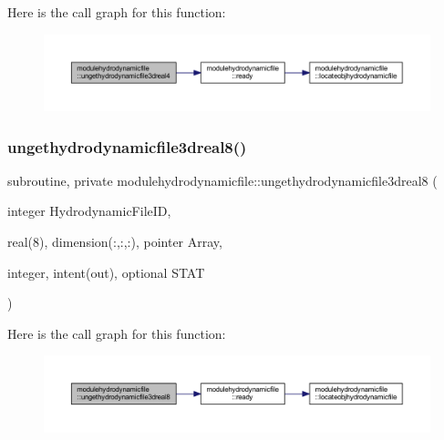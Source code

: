 Here is the call graph for this function\+:\nopagebreak
\begin{figure}[H]
\begin{center}
\leavevmode
\includegraphics[width=350pt]{namespacemodulehydrodynamicfile_a56a478bf1d00b0e9a1ea2795005d1b01_cgraph}
\end{center}
\end{figure}
\mbox{\label{namespacemodulehydrodynamicfile_ac34af87bc19882352d63287997429ba6}} 
\subsubsection{\texorpdfstring{ungethydrodynamicfile3dreal8()}{ungethydrodynamicfile3dreal8()}}
{\footnotesize\ttfamily subroutine, private modulehydrodynamicfile\+::ungethydrodynamicfile3dreal8 (\begin{DoxyParamCaption}\item[{integer}]{Hydrodynamic\+File\+ID,  }\item[{real(8), dimension(\+:,\+:,\+:), pointer}]{Array,  }\item[{integer, intent(out), optional}]{S\+T\+AT }\end{DoxyParamCaption})\hspace{0.3cm}{\ttfamily [private]}}

Here is the call graph for this function\+:\nopagebreak
\begin{figure}[H]
\begin{center}
\leavevmode
\includegraphics[width=350pt]{namespacemodulehydrodynamicfile_ac34af87bc19882352d63287997429ba6_cgraph}
\end{center}
\end{figure}
\mbox{\label{namespacemodulehydrodynamicfile_acd3245c0ac200350cf4d9bd623090e6b}} 
